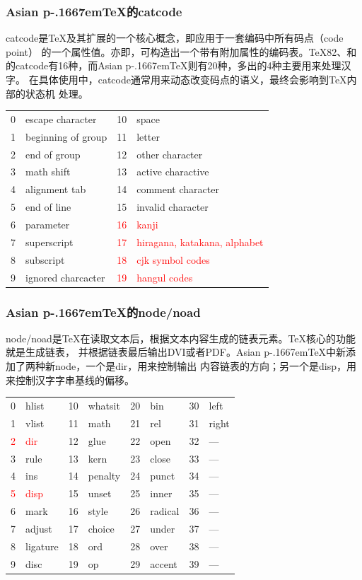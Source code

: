 \documentclass[dvipdfmx]{beamer}
\newcommand{\pTeX}{p\kern-.1667em\TeX}
\newcommand{\ptexng}{Asian \pTeX}
\begin{document}
\begin{frame}[fragile]
\frametitle{\ptexng 的catcode}
catcode是\TeX 及其扩展的一个核心概念，即应用于一套编码中所有码点（code point）
的一个属性值。亦即，可构造出一个带有附加属性的编码表。\TeX82、和
的catcode有16种，而\ptexng 则有20种，多出的4种主要用来处理汉字。
在具体使用中，catcode通常用来动态改变码点的语义，最终会影响到\TeX 内部的状态机
处理。

\begin{center}
\newcommand{\pcc}[1]{\textcolor{red}{#1}}
\begin{tabular}{clcl}
0 &escape character    &10       &space\\
1 &beginning of group  &11       &letter\\
2 &end of group        &12       &other character\\
3 &math shift          &13       &active charactive\\
4 &alignment tab       &14       &comment character\\
5 &end of line         &15       &invalid character\\
6 &parameter           &\pcc{16} &\pcc{kanji}\\
7 &superscript         &\pcc{17} &\pcc{hiragana, katakana, alphabet}\\
8 &subscript           &\pcc{18} &\pcc{cjk symbol codes}\\
9 &ignored charcacter  &\pcc{19} &\pcc{hangul codes}\\
\end{tabular}
\end{center}
\end{frame}
%
\begin{frame}[fragile]
\frametitle{\ptexng 的node/noad}
node/noad是\TeX 在读取文本后，根据文本内容生成的链表元素。\TeX 核心的功能就是生成链表，
并根据链表最后输出DVI或者PDF。\ptexng 中新添加了两种新node，一个是dir，用来控制输出
内容链表的方向；另一个是disp，用来控制汉字字串基线的偏移。

\begin{center}
\newcommand{\pcc}[1]{\textcolor{red}{#1}}
\begin{tabular}{clclclcl}
0      &hlist      &10 &whatsit &20 &bin     &30 &left\\
1      &vlist      &11 &math    &21 &rel     &31 &right\\
\pcc{2}&\pcc{dir}  &12 &glue    &22 &open    &32 &---\\
3      &rule       &13 &kern    &23 &close   &33 &---\\
4      &ins        &14 &penalty &24 &punct   &34 &---\\
\pcc{5}&\pcc{disp} &15 &unset   &25 &inner   &35 &---\\
6      &mark       &16 &style   &26 &radical &36 &---\\
7      &adjust     &17 &choice  &27 &under   &37 &---\\
8      &ligature   &18 &ord     &28 &over    &38 &---\\
9      &disc       &19 &op      &29 &accent  &39 &---\\
\end{tabular}
\end{center}
\end{frame}
\end{document}
